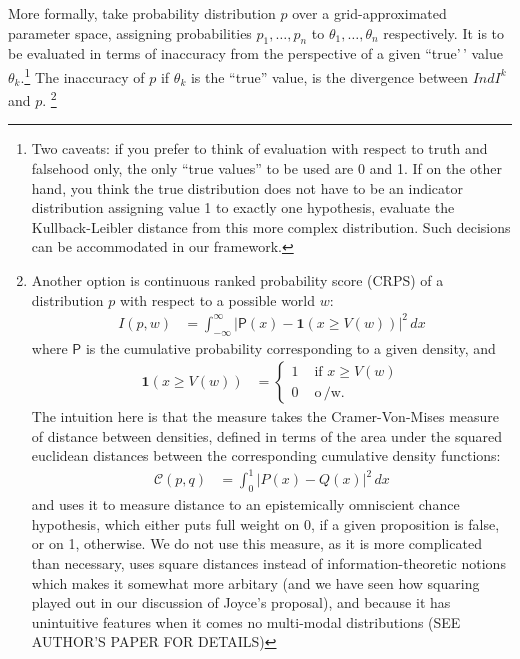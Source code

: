 \documentclass[
  10pt,
  dvipsnames,enabledeprecatedfontcommands]{scrartcl}
\begin{document}
More formally, take probability distribution \(p\) over a
grid-approximated parameter space, assigning probabilities
\(p_1, \dots, p_n\) to \(\theta_1, \dots, \theta_n\) respectively. It is
to be evaluated in terms of inaccuracy from the perspective of a given
``true'\,' value \(\theta_k\).\footnote{Two caveats: if you prefer to
  think of evaluation with respect to truth and falsehood only, the only
  ``true values'' to be used are 0 and 1. If on the other hand, you
  think the true distribution does not have to be an indicator
  distribution assigning value 1 to exactly one hypothesis, evaluate the
  Kullback-Leibler distance from this more complex distribution. Such
  decisions can be accommodated in our framework.} The inaccuracy of
\(p\) if \(\theta_k\) is the ``true'' value, is the divergence between
\(IndI^k\) and \(p\). \footnote{Another option is continuous ranked
  probability score (CRPS) of a distribution \(p\) with respect to a
  possible world \(w\): \begin{align*}
  I(p,w) &= \int_{-\infty}^\infty \vert \mathsf{P}(x) - \mathbf{ 1 }(x\geq V(w))\vert ^2 \, dx
  \end{align*} \noindent where \(\mathsf{P}\) is the cumulative
  probability corresponding to a given density, and \begin{align*}
  \mathbf{ 1 }(x \geq V(w)) & = \begin{cases} 1 & \text{ if } x \geq V(w)\\
  0 & \text{ o$\,$/w. }
  \end{cases}
  \end{align*} \noindent  The intuition here is that the measure takes
  the Cramer-Von-Mises measure of distance between densities, defined in
  terms of the area under the squared euclidean distances between the
  corresponding cumulative density functions: \begin{align*}
  \mathcal{C}(p,q) & = \int_{0}^{1} \vert P(x) - Q(x)\vert^2 \, dx
  \end{align*} \noindent and uses it to measure distance to an
  epistemically omniscient chance hypothesis, which either puts full
  weight on 0, if a given proposition is false, or on 1, otherwise. We
  do not use this measure, as it is more complicated than necessary,
  uses square distances instead of information-theoretic notions which
  makes it somewhat more arbitary (and we have seen how squaring played
  out in our discussion of Joyce's proposal), and because it has
  unintuitive features when it comes no multi-modal distributions (SEE
  AUTHOR'S PAPER FOR DETAILS)}
\end{document}
